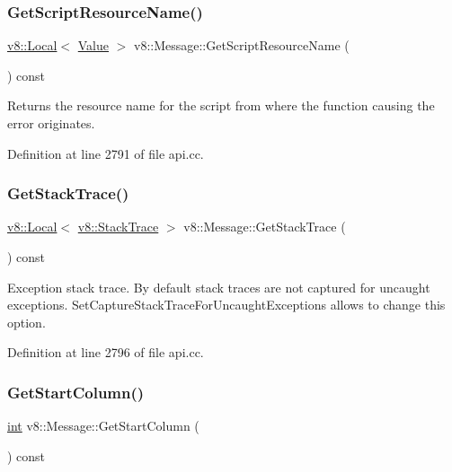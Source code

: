 \subsubsection{\texorpdfstring{Get\+Script\+Resource\+Name()}{GetScriptResourceName()}}
{\footnotesize\ttfamily \mbox{\hyperlink{classv8_1_1Local}{v8\+::\+Local}}$<$ \mbox{\hyperlink{classv8_1_1Value}{Value}} $>$ v8\+::\+Message\+::\+Get\+Script\+Resource\+Name (\begin{DoxyParamCaption}{ }\end{DoxyParamCaption}) const}

Returns the resource name for the script from where the function causing the error originates. 

Definition at line 2791 of file api.\+cc.

\mbox{\label{classv8_1_1Message_a14cf84edd3b137e9eef27a3a2f3675a8}} 
\subsubsection{\texorpdfstring{Get\+Stack\+Trace()}{GetStackTrace()}}
{\footnotesize\ttfamily \mbox{\hyperlink{classv8_1_1Local}{v8\+::\+Local}}$<$ \mbox{\hyperlink{classv8_1_1StackTrace}{v8\+::\+Stack\+Trace}} $>$ v8\+::\+Message\+::\+Get\+Stack\+Trace (\begin{DoxyParamCaption}{ }\end{DoxyParamCaption}) const}

Exception stack trace. By default stack traces are not captured for uncaught exceptions. Set\+Capture\+Stack\+Trace\+For\+Uncaught\+Exceptions allows to change this option. 

Definition at line 2796 of file api.\+cc.

\mbox{\label{classv8_1_1Message_a3be9714cc977899bc1c935b00a140969}} 
\subsubsection{\texorpdfstring{Get\+Start\+Column()}{GetStartColumn()}}
{\footnotesize\ttfamily \mbox{\hyperlink{classint}{int}} v8\+::\+Message\+::\+Get\+Start\+Column (\begin{DoxyParamCaption}{ }\end{DoxyParamCaption}) const}

